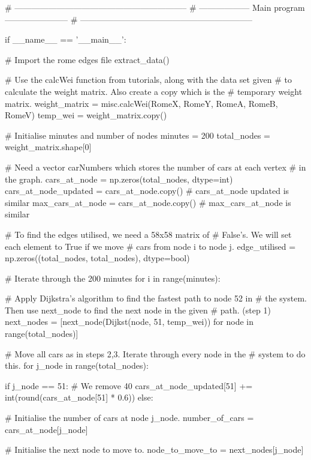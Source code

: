 \documentclass[paper=a4, fontsize=12pt]{scrartcl} %
\numberwithin{equation}{section}       %
\numberwithin{figure}{section}         %
\numberwithin{table}{section}          %
\begin{document}
\begin{python}
    # --------------------------------------------------------------
    # ------------------    Main program     -----------------------
    # --------------------------------------------------------------


if __name__ == '__main__':

    # Import the rome edges file
    extract_data()

    # Use the calcWei function from tutorials, along with the data set given
    # to calculate the weight matrix. Also create a copy which is the
    # temporary weight matrix.
    weight_matrix = misc.calcWei(RomeX, RomeY, RomeA, RomeB, RomeV)
    temp_wei = weight_matrix.copy()

    # Initialise minutes and number of nodes
    minutes = 200
    total_nodes = weight_matrix.shape[0]

    # Need a vector carNumbers which stores the number of cars at each vertex
    # in the graph.
    cars_at_node = np.zeros(total_nodes, dtype=int)
    cars_at_node_updated = cars_at_node.copy()  # cars_at_node updated is similar
    max_cars_at_node = cars_at_node.copy()  # max_cars_at_node is similar

    # To find the edges utilised, we need a 58x58 matrix of
    # False's. We will set each element to True if we move
    # cars from node i to node j.
    edge_utilised = np.zeros((total_nodes, total_nodes), dtype=bool)

    # Iterate through the 200 minutes
    for i in range(minutes):

        # Apply Dijkstra's algorithm to find the fastest path to node 52 in
        # the system. Then use next_node to find the next node in the given
        # path. (step 1)
        next_nodes = [next_node(Dijkst(node, 51, temp_wei))
                      for node in range(total_nodes)]

        # Move all cars as in steps 2,3. Iterate through every node in the
        # system to do this.
        for j_node in range(total_nodes):

            if j_node == 51:
                # We remove 40%
                cars_at_node_updated[51] += int(round(cars_at_node[51] * 0.6))
            else:

                # Initialise the number of cars at node j_node.
                number_of_cars = cars_at_node[j_node]

                # Initialise the next node to move to.
                node_to_move_to = next_nodes[j_node]


\end{python}
\end{document}
